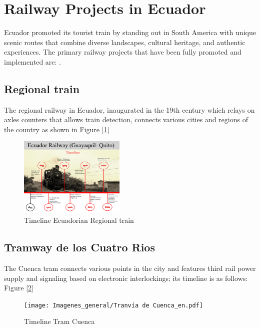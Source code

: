 \documentclass[conference]{IEEEtran}
\begin{document}

\section{Railway Projects in Ecuador}

Ecuador promoted its tourist train by standing out in South America with unique scenic routes that combine diverse landscapes, cultural heritage, and authentic experiences. The primary railway projects that have been fully promoted and implemented are: \cite{b2}. 

\subsection{Regional train}
The regional railway in Ecuador, inaugurated in the 19th century which relays on axles counters that allows train detection,  connects various cities and regions of the country as shown in Figure [\ref{fig:timeline_train_reg}]
\begin{figure}[htbp]
    \centering
    \includegraphics[width=0.45\textwidth, scale=1]{Imagenes_general/Timeline railway Guayaquil - Quito_1.pdf}
    \caption{Timeline Ecuadorian Regional train}
    \label{fig:timeline_train_reg}
\end{figure}

\subsection{Tramway de los Cuatro Rios}
The Cuenca tram \cite{b3} connects various points in the city and features third rail power supply and signaling based on electronic interlockings; its timeline is as follows: Figure [\ref{fig:timeline_train_cu}]
\begin{figure}[htbp]
    \centering
    \texttt{[image: Imagenes\_general/Tranvía de Cuenca\_en.pdf]}
    \caption{Timeline Tram Cuenca}
    \label{fig:timeline_train_cu}
\end{figure}
\end{document}
